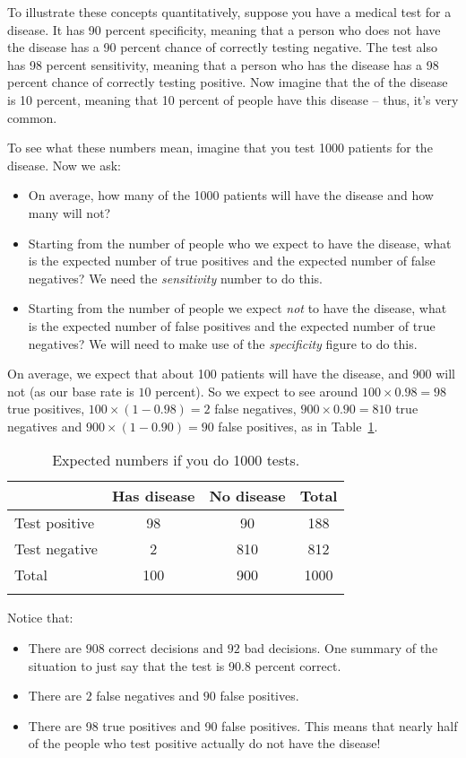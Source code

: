 To illustrate these concepts quantitatively, suppose you have a medical test for a  disease. It has 90 percent specificity, meaning that a person who does not have the disease has a 90 percent chance of correctly testing negative.  The test also has 98 percent sensitivity, meaning that a person who has the disease has a 98 percent chance of correctly testing positive.  Now imagine that the  of the disease is 10 percent, meaning that 10 percent of people have this disease -- thus, it's very common. 

To see what these numbers mean, imagine that you test 1000 patients for the disease.  Now we ask:

\begin{itemize}
	\item On average, how many of the 1000 patients will have the disease and how many will not?
	\item Starting from the number of people who we expect to have the disease, 
what is the expected number of true positives and the expected number of false negatives? We need the \emph{sensitivity} number to do this.
	\item Starting from the number of people we expect \emph{not} to have the disease, what is the expected number of false positives and the expected number of true negatives? 
	We will need to make use of the \emph{specificity} figure to do this.
\end{itemize}

On average, we expect that about 100
patients will have the disease, and 900 will not (as our base rate is $10$ percent). So we expect to see around $100\times 0.98 = 98$ true positives,
$100 \times (1-0.98) = 2 $ false negatives, $900 \times 0.90 = 810$ true negatives and $900 \times (1-0.90) = 90$ false positives, as in Table~\ref{fig:diagnostic3}. 

\begin{table}
\begin{tabular}{lccc}
\lsptoprule
& Has disease & No disease & Total\\ \midrule
Test positive & 98 & 90 &  188 \\
Test negative & 2 & 810  & 812 \\
Total & 100 & 900 & 1000 \\ 
\lspbottomrule
\end{tabular}
\caption{Expected numbers if you do 1000 tests.}
\label{fig:diagnostic3}
\end{table}

Notice that:
\begin{itemize}
	\item There are $908$ correct decisions and $92$ bad decisions. One summary of the situation to just say that the test is 90.8 percent correct.
	\item There are $2$ false negatives and $90$ false positives. 
	\item There are 98 true positives and 90 false positives. This means that nearly half of the people who test positive actually do not have the disease!
\end{itemize}

